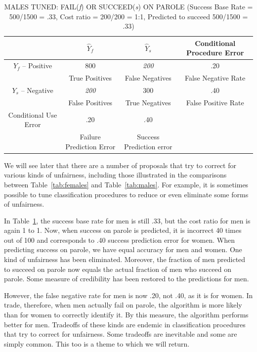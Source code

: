 \documentclass[12pt]{article}
\begin{document}
\begin{table}[htp]
\caption{MALES TUNED: FAIL(\textit{f}) OR SUCCEED(\textit{s}) ON PAROLE  (Success Base Rate = 500/1500 = .33, Cost ratio = 200/200 = 1:1, Predicted to succeed 500/1500 = .33)}
\begin{center}
\tiny
\begin{tabular}{|c|c|c|c|}
\hline
      & $\hat{Y}_{f}$ & $\hat{Y}_{s}$ & Conditional Procedure Error  \\ \hline
 $Y_{f}$ -- Positive  & 800 & \textit{200} & .20 \\
      & True Positives & False Negatives & False  Negative Rate\\   \hline 
 $Y_{s}$  -- Negative & \textit{200} & 300 & .40 \\
      & False Positives & True Negatives & False Positive Rate  \\  \hline
     Conditional Use Error & .20 & .40 & \\ 
      & Failure Prediction Error & Success Prediction error & \\
 \hline
\end{tabular}
\end{center}
\label{tab:tunedmales}
\end{table}

We will see later that there are a number of proposals that try to correct for various kinds of unfairness, including those illustrated in the comparisons between Table~\ref{tab:females} and Table~\ref{tab:males}. For example, it is sometimes possible to tune classification procedures to reduce or even eliminate some forms of unfairness. 

In Table~\ref{tab:tunedmales}, the success base rate for men is still .33, but the cost ratio for men is again 1 to 1. Now, when success on parole is predicted, it is incorrect 40 times out of 100 and corresponds to .40 success prediction error for women. When predicting success on parole, we have equal accuracy for men and women. One kind of unfairness has been eliminated. Moreover, the fraction of men predicted to succeed on parole now equals the actual fraction of men who succeed on parole. Some measure of credibility has been restored to the predictions for men. 

However, the false negative rate for men is now .20, not .40, as it is for women. In trade, therefore, when men actually fail on parole, the algorithm is more likely than for women to correctly identify it. By this measure, the algorithm performs better for men.  Tradeoffs of these kinds are endemic in classification procedures that try to correct for unfairness. Some tradeoffs are inevitable and some are simply common. This too is a theme to which we will return. 
\end{document}
